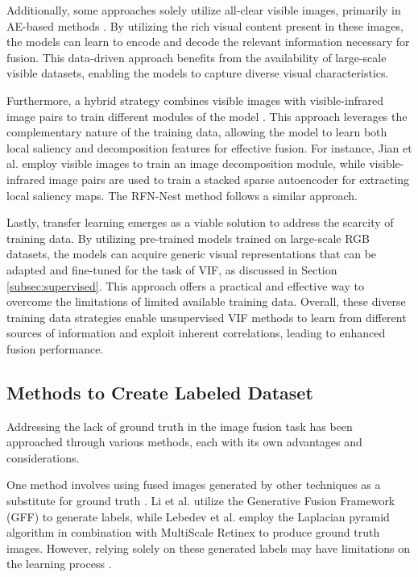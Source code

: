 Additionally, some approaches solely utilize all-clear visible images, primarily in AE-based methods \cite{li2019infrared}. By utilizing the rich visual content present in these images, the models can learn to encode and decode the relevant information necessary for fusion. This data-driven approach benefits from the availability of large-scale visible datasets, enabling the models to capture diverse visual characteristics.

Furthermore, a hybrid strategy combines visible images with visible-infrared image pairs to train different modules of the model \cite{jian2021infrared}. This approach leverages the complementary nature of the training data, allowing the model to learn both local saliency and decomposition features for effective fusion. For instance, Jian et al. \cite{li2021rfn} employ visible images to train an image decomposition module, while visible-infrared image pairs are used to train a stacked sparse autoencoder for extracting local saliency maps. The RFN-Nest method \cite{li2021rfn} follows a similar approach.

Lastly, transfer learning emerges as a viable solution to address the scarcity of training data. By utilizing pre-trained models trained on large-scale RGB datasets, the models can acquire generic visual representations that can be adapted and fine-tuned for the task of VIF, as discussed in Section \ref{subsec:supervised}. This approach offers a practical and effective way to overcome the limitations of limited available training data. Overall, these diverse training data strategies enable unsupervised VIF methods to learn from different sources of information and exploit inherent correlations, leading to enhanced fusion performance.

\subsection{Methods to Create Labeled Dataset}
\label{subsec:DatasetM}

Addressing the lack of ground truth in the image fusion task has been approached through various methods, each with its own advantages and considerations.

One method involves using fused images generated by other techniques as a substitute for ground truth \cite{li2019coupled, lebedev2019multisensor}. Li et al. \cite{li2019coupled} utilize the Generative Fusion Framework (GFF) \cite{li2013image} to generate labels, while Lebedev et al. \cite{lebedev2019multisensor} employ the Laplacian pyramid algorithm in combination with MultiScale Retinex \cite{petro2014multiscale} to produce ground truth images. However, relying solely on these generated labels may have limitations on the learning process \cite{ma2020ganmcc}.

